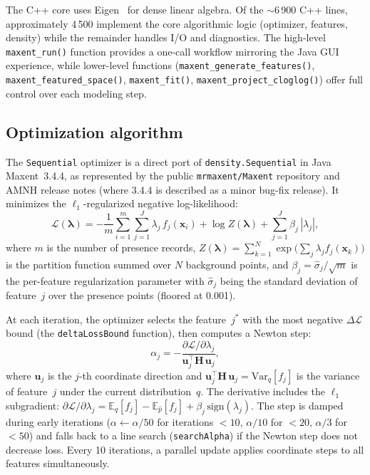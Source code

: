 \documentclass[10pt,letterpaper]{article}
\begin{document}
The C++ core uses Eigen~\cite{Guennebaud2010} for dense linear algebra.
Of the $\sim$6\,900 C++ lines, approximately 4\,500 implement the core
algorithmic logic (optimizer, features, density) while the remainder
handles I/O and diagnostics.
The high-level \texttt{maxent\_run()} function provides a one-call
workflow mirroring the Java GUI experience, while lower-level functions
(\texttt{maxent\_generate\_features()}, \texttt{maxent\_featured\_space()},
\texttt{maxent\_fit()}, \texttt{maxent\_project\_cloglog()}) offer full
control over each modeling step.

\subsection*{Optimization algorithm}

The \texttt{Sequential} optimizer is a direct port of
\texttt{density.Sequential} in Java Maxent~3.4.4, as represented by the
public \texttt{mrmaxent/Maxent} repository and AMNH release notes (where
3.4.4 is described as a minor bug-fix release).
It minimizes the $\ell_1$-regularized negative log-likelihood:
\begin{equation}\label{eq:objective}
  \mathcal{L}(\boldsymbol{\lambda})
  = -\frac{1}{m}\sum_{i=1}^{m} \sum_{j=1}^{J}
      \lambda_j\, f_j(\mathbf{x}_i)
    + \log Z(\boldsymbol{\lambda})
    + \sum_{j=1}^{J} \beta_j\,|\lambda_j|,
\end{equation}
where $m$ is the number of presence records,
$Z(\boldsymbol{\lambda})
= \sum_{k=1}^{N} \exp\!\bigl(\sum_j \lambda_j f_j(\mathbf{x}_k)\bigr)$
is the partition function summed over $N$ background points, and
$\beta_j = \hat\sigma_j / \sqrt{m}$ is the per-feature regularization
parameter with $\hat\sigma_j$ being the standard deviation of feature~$j$
over the presence points (floored at 0.001).

At each iteration, the optimizer selects the feature~$j^*$ with the most
negative $\Delta\mathcal{L}$ bound (the \texttt{deltaLossBound}
function), then computes a Newton step:
\begin{equation}\label{eq:newton}
  \alpha_j = -\frac{\partial \mathcal{L}/\partial \lambda_j}
    {\mathbf{u}_j^\top \mathbf{H}\, \mathbf{u}_j},
\end{equation}
where $\mathbf{u}_j$ is the $j$-th coordinate direction and
$\mathbf{u}_j^\top \mathbf{H}\, \mathbf{u}_j = \mathrm{Var}_q[f_j]$
is the variance of feature~$j$ under the current distribution~$q$.
The derivative includes the $\ell_1$ subgradient:
$\partial \mathcal{L}/\partial \lambda_j = \mathbb{E}_q[f_j] -
\mathbb{E}_{\hat{p}}[f_j] + \beta_j\,\mathrm{sign}(\lambda_j)$.
The step is damped during early iterations
($\alpha \leftarrow \alpha/50$ for iterations $<10$,
$\alpha/10$ for $<20$, $\alpha/3$ for $<50$) and falls back to
a line search (\texttt{searchAlpha}) if the Newton step does not
decrease loss.
Every 10 iterations, a parallel update applies coordinate steps to all
features simultaneously.
\end{document}
